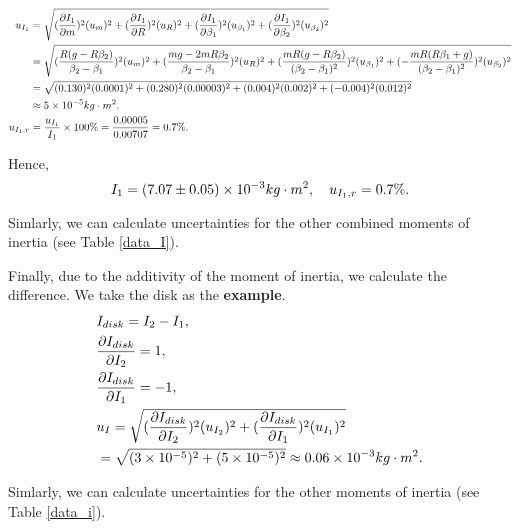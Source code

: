     \[
    \begin{split}
        u_{I_1}&=\sqrt{(\frac{\partial I_1}{\partial m})^2(u_m)^2+(\frac{\partial I_1}{\partial R})^2(u_R)^2+(\frac{\partial I_1}{\partial \beta_1})^2(u_{\beta_1})^2+(\frac{\partial I_1}{\partial \beta_2})^2(u_{\beta_2})^2}\\
        &=\sqrt{(\frac{R(g-R\beta_2)}{\beta_2-\beta_1})^2(u_m)^2+(\frac{mg-2mR\beta_2}{\beta_2-\beta_1})^2(u_R)^2+(\frac{mR(g-R\beta_2)}{(\beta_2-\beta_1)^2})^2(u_{\beta_1})^2+(-\frac{mR(R\beta_1+g)}{(\beta_2-\beta_1)^2})^2(u_{\beta_2})^2}\\
        &=\sqrt{(0.130)^2(0.0001)^2+(0.280)^2(0.00003)^2+(0.004)^2(0.002)^2+(-0.004)^2(0.012)^2}\\
        &\approx5\times10^{-5}kg\cdot m^2.\\
        u_{I_1,r}&=\frac{u_{I_1}}{I_1}\times100\%=\frac{0.00005}{0.00707}=0.7\%.
    \end{split}
    \]

    Hence,
    \[
        I_1=(7.07\pm 0.05) \times10^{-3}kg\cdot m^2, \quad u_{I_1,r}=0.7\%.
    \]

    Simlarly, we can calculate uncertainties for the other combined moments of inertia (see Table \ref{data_I}).

    Finally, due to the additivity of the moment of inertia, we calculate the difference. We take the disk as the \textbf{example}.
    \[
    \begin{split}
        &I_{disk}=I_2-I_1,\\
        &\frac{\partial I_{disk}}{\partial I_2}=1,\\
        &\frac{\partial I_{disk}}{\partial I_1}=-1,\\
        &u_{I}=\sqrt{(\frac{\partial I_{disk}}{\partial I_2})^2(u_{I_2})^2+(\frac{\partial I_{disk}}{\partial I_1})^2(u_{I_1})^2}\\
        &=\sqrt{(3\times10^{-5})^2+(5\times10^{-5})^2}\approx0.06\times10^{-3}kg\cdot m^2.
    \end{split}
    \]

    Simlarly, we can calculate uncertainties for the other moments of inertia (see Table \ref{data_i}).